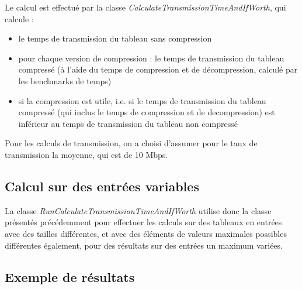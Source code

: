 \documentclass[titlepage]{article}
\begin{document}
Le calcul est effectué par la classe \textsl{CalculateTransmissionTimeAndIfWorth}, qui calcule :
\begin{itemize}
\item le temps de transmission du tableau sans compression
\item pour chaque version de compression : le temps de transmission du tableau compressé (à l'aide du temps de compression et de décompression, calculé par les benchmarks de temps)
\item si la compression est utile, i.e. si le temps de transmission du tableau compressé (qui inclus le temps de compression et de decompression) est inférieur au temps de transmission du tableau non compressé
\end{itemize}
Pour les calculs de transmission, on a choisi d'assumer pour le taux de transmission la moyenne, qui est de 10 Mbps.

\subsection{Calcul sur des entrées variables}

La classe \textsl{RunCalculateTransmissionTimeAndIfWorth} utilise donc la classe présentés précédemment pour effectuer les calculs sur des tableaux en entrées avec des tailles différentes, et avec des éléments de valeurs maximales possibles différentes également, pour des résultats sur des entrées un maximum variées.

\subsection{Exemple de résultats}
\end{document}

